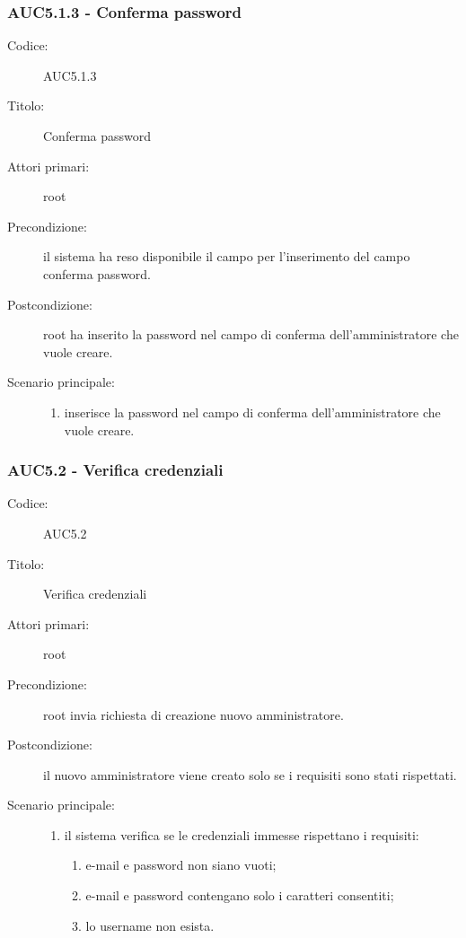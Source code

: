 \documentclass[casi-duso]{subfiles}
\begin{document}
\subsubsection{AUC5.1.3 - Conferma password}%
\label{subsub:AUC5.1.3}
\begin{description}
  \item[Codice:] AUC5.1.3
  \item[Titolo:] Conferma password
  \item[Attori primari:] root
  \item[Precondizione:] il sistema ha reso disponibile il campo per l'inserimento del campo conferma password.
  \item[Postcondizione:] root ha inserito la password nel campo di conferma dell'amministratore che vuole creare.
  \item[Scenario principale:]
  \begin{enumerate}
    \item {} inserisce la password nel campo di conferma dell'amministratore che vuole creare.
  \end{enumerate}
\end{description}

\subsubsection{AUC5.2 - Verifica credenziali}%
\label{subsub:AUC5.2}
\begin{description}
  \item[Codice:] AUC5.2
  \item[Titolo:] Verifica credenziali
  \item[Attori primari:] root
  \item[Precondizione:] root invia richiesta di creazione nuovo amministratore.
  \item[Postcondizione:] il nuovo amministratore viene creato solo se i requisiti sono stati rispettati.
  \item[Scenario principale:]
  \begin{enumerate}
    \item il sistema verifica se le credenziali immesse rispettano i requisiti:
    \begin{enumerate}
      \item e-mail e password non siano vuoti;
      \item e-mail e password contengano solo i caratteri consentiti;
      \item lo username non esista.
    \end{enumerate}
  \end{enumerate}
\end{description}
\end{document}
